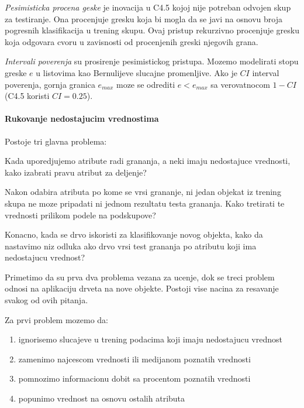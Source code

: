 \documentclass[a4paper]{article}
\begin{document}
\emph{Pesimisticka procena geske} je inovacija u C4.5 kojoj nije potreban odvojen skup za
testiranje. Ona procenjuje gresku koja bi mogla da se javi na osnovu broja pogresnih klasifikacija u
trening skupu. Ovaj pristup rekurzivno procenjuje gresku koja odgovara cvoru u zavisnosti od
procenjenih greski njegovih grana.

\emph{Intervali poverenja} su prosirenje pesimistickog pristupa. Mozemo modelirati stopu greske \(e\)
u listovima  kao Bernulijeve slucajne promenljive. Ako je \(CI\) interval poverenja, gornja granica
\(e_{max}\) moze se odrediti \(e < e_{max}\) sa verovatnocom \(1-CI\) (C4.5 koristi \(CI=0.25\)).

\paragraph{Rukovanje nedostajucim vrednostima} Postoje tri glavna problema:
\begin{enumerate*}[label=(\roman*)]
    \item Kada uporedjujemo atribute radi grananja, a neki imaju nedostajuce vrednosti, kako
        izabrati pravu atribut za deljenje?
    \item Nakon odabira atributa po kome se vrsi grananje, ni jedan objekat iz trening skupa ne moze
        pripadati ni jednom rezultatu testa grananja. Kako tretirati te vrednosti prilikom podele na
        podskupove?
    \item Konacno, kada se drvo iskoristi za klasifikovanje novog objekta, kako da nastavimo niz
        odluka ako drvo vrsi test grananja po atributu koji ima nedostajucu vrednost?
\end{enumerate*}
Primetimo da su prva dva problema vezana za ucenje, dok se treci problem odnosi na aplikaciju drveta
na nove objekte. Postoji vise nacina za resavanje svakog od ovih pitanja.

Za prvi problem mozemo da:
\begin{enumerate}
    \item ignorisemo slucajeve u trening podacima koji imaju nedostajucu vrednost
    \item zamenimo najcescom vrednosti ili medijanom poznatih vrednosti
    \item pomnozimo informacionu dobit sa procentom poznatih vrednosti
    \item popunimo vrednost na osnovu ostalih atributa
\end{enumerate}
\end{document}
